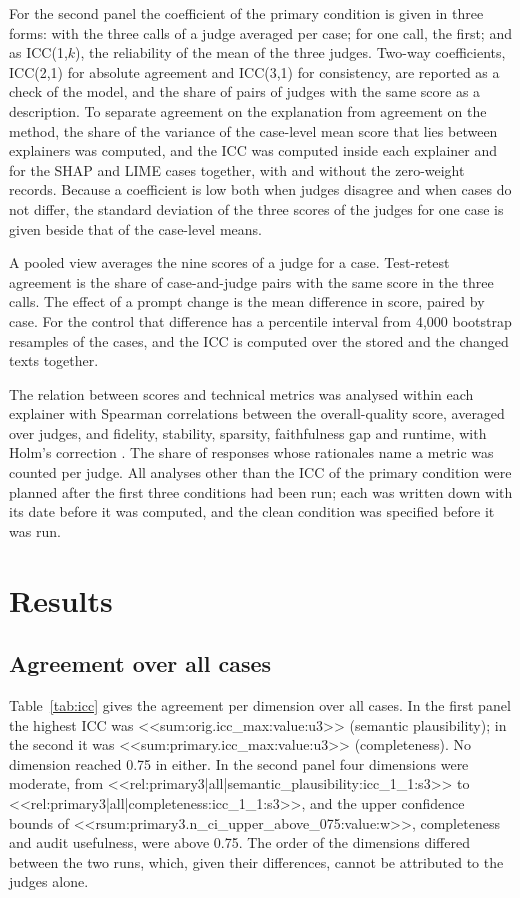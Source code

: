 \documentclass[12pt,letterpaper]{article}
\begin{document}
For the second panel the coefficient of the primary condition is given in three forms:
with the three calls of a judge averaged per case;
for one call, the first; and as ICC(1,$k$), the reliability of the mean of the three
judges. Two-way
coefficients, ICC(2,1) for absolute agreement and ICC(3,1) for consistency, are reported
as a check of the model, and the share of pairs of judges with the same score as a
description. To separate agreement on the explanation from agreement on the method, the
share of the variance of the case-level mean score that lies between explainers was
computed, and the ICC was computed inside each explainer and for the SHAP and LIME cases
together, with and without the zero-weight records. Because a coefficient is low both
when judges disagree and when cases do not differ, the standard deviation of the three
scores of the judges for one case is given beside that of the case-level means.

A pooled view averages the nine scores of a judge for a case. Test-retest agreement is the share of case-and-judge pairs with the same
score in the three calls. The effect of a prompt change is the mean difference in score,
paired by case. For the control that difference has a percentile interval from 4,000
bootstrap resamples of the cases, and the ICC is computed over the stored and the changed
texts together.

The relation between scores and technical metrics was analysed within each explainer with
Spearman correlations between the overall-quality score, averaged over judges, and
fidelity, stability, sparsity, faithfulness gap and runtime, with Holm's correction
\cite{holm1979simple}. The share of responses whose rationales name a metric was counted
per judge. All analyses other than the ICC of the primary condition were planned after
the first three conditions had been run; each was written down with its date before it
was computed, and the clean condition was specified before it was run.

\section{Results}

\subsection{Agreement over all cases}

Table~\ref{tab:icc} gives the agreement per dimension over all cases. In the first panel
the highest ICC was <<sum:orig.icc_max:value:u3>> (semantic plausibility); in the second
it was <<sum:primary.icc_max:value:u3>> (completeness). No dimension reached 0.75 in
either. In the second panel four dimensions were moderate, from
<<rel:primary3|all|semantic_plausibility:icc_1_1:s3>> to
<<rel:primary3|all|completeness:icc_1_1:s3>>, and the upper confidence bounds of
<<rsum:primary3.n_ci_upper_above_075:value:w>>, completeness and audit
usefulness, were above 0.75. The order of the dimensions differed between the two runs,
which, given their differences, cannot be attributed to the judges alone.
\end{document}
